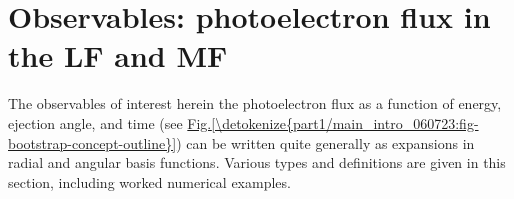 \documentclass[letterpaper,table,10pt,english]{jupyterBook}
\begin{document}
\section{Observables: photoelectron flux in the LF and MF}
\label{\detokenize{part1/theory_observables_intro_100723:observables-photoelectron-flux-in-the-lf-and-mf}}\label{\detokenize{part1/theory_observables_intro_100723:sect-theory-observables}}\label{\detokenize{part1/theory_observables_intro_100723::doc}}
\sphinxAtStartPar
The observables of interest herein \sphinxhyphen{} the photoelectron flux as a function of energy, ejection angle, and time (see \hyperref[\detokenize{part1/main_intro_060723:fig-bootstrap-concept-outline}]{Fig.\@ \ref{\detokenize{part1/main_intro_060723:fig-bootstrap-concept-outline}}}) \sphinxhyphen{} can be written quite generally as expansions in radial and angular basis functions. Various types and definitions are given in this section, including worked numerical examples.
\end{document}
